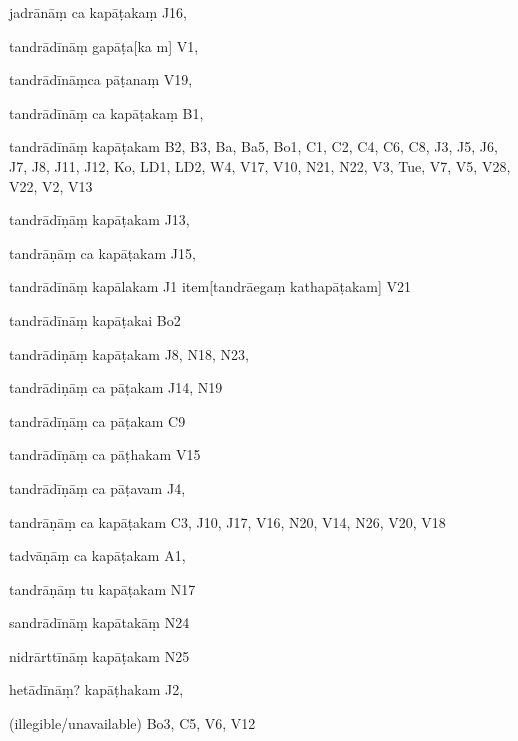 \begin{ekdosis}
\begin{marma}[hp01_055]
\begin{marma}[hp02_009]
\begin{marma}[hp02_011]
\begin{marma}[hp02_33b]
\item[jadrānāṃ ca kapāṭakaṃ] J16,
\item[tandrādīnāṃ gapāṭa[ka]m] V1,
\item[tandrādīnāṃca pāṭanaṃ] V19,
\item[tandrādīnāṃ ca kapāṭakaṃ] B1,
\item[tandrādīnāṃ kapāṭakam] B2, B3, Ba, Ba5, Bo1, C1, C2, C4, C6, C8, J3, J5, J6, J7, J8, J11, J12, Ko, LD1, LD2, W4, V17, V10, N21, N22, V3, Tue, V7, V5, V28, V22, V2, V13
\item[tandrādīṇāṃ kapāṭakam] J13, 
\item[tandrāṇāṃ ca kapāṭakam] J15, 
\item[tandrādīnāṃ kapālakam] J1
item[tandrāegaṃ kathapāṭakam] V21
\item[tandrādīnāṃ kapāṭakai] Bo2
\item[tandrādiṇāṃ kapāṭakam] J8, N18, N23,
\item[tandrādiṇāṃ ca pāṭakam] J14, N19
\item[tandrādīṇāṃ ca pāṭakam] C9
\item[tandrādīṇāṃ ca pāṭhakam] V15
\item[tandrādīṇāṃ ca pāṭavam] J4,
\item[tandrāṇāṃ ca kapāṭakam] C3, J10, J17, V16, N20, V14, N26, V20, V18
\item[tadvāṇāṃ ca kapāṭakam] A1,
\item[tandrāṇāṃ tu kapāṭakam] N17
\item[sandrādīnāṃ kapātakāṃ] N24
\item[nidrārttīnāṃ kapāṭakam] N25
\item[hetādīnāṃ? kapāṭhakam] J2,
\item[(illegible/unavailable)] Bo3, C5, V6, V12
 \begin{description}

        \end{description}
\end{marma}


\end{marma}
\end{marma}
\end{marma}
\end{ekdosis}
